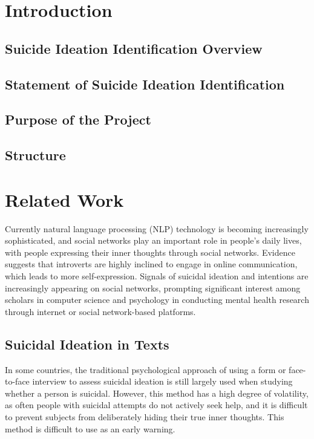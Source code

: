 \documentclass[ %
                    author={Louis Wang},
                supervisor={Dr. Qiang Liu},
                    degree={MSc},
                     title={Identification of Suicide Ideation in Texts},
                      type={},
                      year={2024}]{dissertation}
\begin{document}
\mainmatter


\chapter{Introduction}
\label{chap:introduction}


\section{Suicide Ideation Identification Overview}

\section{Statement of Suicide Ideation Identification}

\section{Purpose of the Project}

\section{Structure}



\chapter{Related Work}
\label{chap:background}
\noindent
Currently natural language processing (NLP) technology is becoming increasingly sophisticated, and social networks play an important role in people's daily lives, with people expressing their inner thoughts through social networks. 
Evidence suggests that introverts are highly inclined to engage in online communication, which leads to more self-expression. Signals of suicidal ideation and intentions are increasingly appearing on social networks, prompting significant interest among scholars in computer science and psychology in conducting mental health research through internet or social network-based platforms.

\section{Suicidal Ideation in Texts}
\noindent
In some countries, the traditional psychological approach of using a form or face-to-face interview to assess suicidal ideation is still largely used when studying whether a person is suicidal. However, this method has a high degree of volatility, as often people with suicidal attempts do not actively seek help, and it is difficult to prevent subjects from deliberately hiding their true inner thoughts. This method is difficult to use as an early warning.
\end{document}
